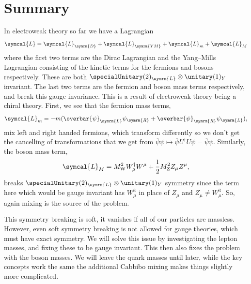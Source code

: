 \documentclass[fleqn]{NotesClass}
\newcommand{\Pparticle}[1]{\mathrm{#1}}
\newcommand{\PZ}{\ensuremath{\Pparticle{Z}}}
\newcommand{\PW}{\ensuremath{\Pparticle{W}}}
\newcommand{\diracadjoint}[1]{\overbar{#1}}
\newcommand{\hermit}{\dagger}
\newcommand{\lagrangianDensity}{\symcal{L}}
\newcommand{\Left}{\symrm{L}}
\newcommand{\Right}{\symrm{R}}
\begin{document}
    \section{Summary}
    In electroweak theory so far we have a Lagrangian
    \begin{equation}
        \lagrangianDensity = \lagrangianDensity_{\symrm{D}} + \lagrangianDensity_{\symrm{YM}} + \lagrangianDensity_m + \lagrangianDensity_M
    \end{equation}
    where the first two terms are the Dirac Lagrangian and the Yang--Mills Lagrangian consisting of the kinetic terms for the fermions and bosons respectively.
    These are both \(\specialUnitary(2)_{\Left} \otimes \unitary(1)_Y\) invariant.
    The last two terms are the fermion and boson mass terms respectively, and break this gauge invariance.
    This is a result of electroweak theory being a chiral theory.
    First, we see that the fermion mass terms,
    \begin{equation}
        \lagrangianDensity_{m} = -m(\diracadjoint{\psi}_{\Left} \psi_{\Right} + \diracadjoint{\psi}_{\Right} \psi_{\Left}),
    \end{equation}
    mix left and right handed fermions, which transform differently so we don't get the cancelling of transformations that we get from \(\diracadjoint{\psi}\psi \mapsto \diracadjoint{\psi}U^\hermit U\psi = \diracadjoint{\psi}\psi\).
    Similarly, the boson mass term,
    \begin{equation}
        \lagrangianDensity_M = M_{\PW}^2 W_\mu^\hermit W^\mu + \frac{1}{2}M_{\PZ}^2 Z_\mu Z^\mu,
    \end{equation}
    breaks \(\specialUnitary(2)_{\Left} \otimes \unitary(1)_Y\) symmetry since the term here which would be gauge invariant has \(W_\mu^3\) in place of \(Z_\mu\) and \(Z_\mu \ne W_\mu^3\).
    So, again mixing is the source of the problem.
    
    This symmetry breaking is soft, it vanishes if all of our particles are massless.
    However, even soft symmetry breaking is not allowed for gauge theories, which must have exact symmetry.
    We will solve this issue by investigating the lepton masses, and fixing these to be gauge invariant.
    This then also fixes the problem with the boson masses.
    We will leave the quark masses until later, while the key concepts work the same the additional Cabbibo mixing makes things slightly more complicated.
    
\end{document}
